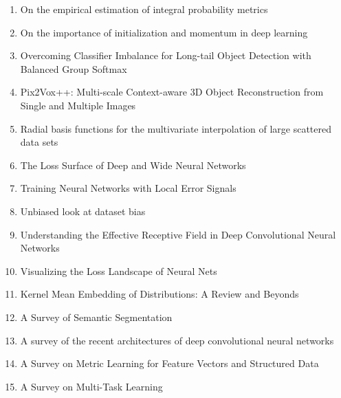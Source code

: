\documentclass[acmlarge]{acmart}
\begin{document}
\begin{enumerate}
	\item On the empirical estimation of integral probability metrics \cite{Sriperumbudur2012OnTE} 

	\item On the importance of initialization and momentum in deep learning \cite{Sutskever2013OnTI} 

	\item Overcoming Classifier Imbalance for Long-tail Object Detection with Balanced Group Softmax \cite{Li2020OvercomingCI} 

	\item Pix2Vox++: Multi-scale Context-aware 3D Object Reconstruction from Single and Multiple Images \cite{Xie2020Pix2VoxMC} 

	\item Radial basis functions for the multivariate interpolation of large scattered data sets \cite{Lazzaro2002RadialBF} 

	\item The Loss Surface of Deep and Wide Neural Networks \cite{Nguyen2017TheLS} 

	\item Training Neural Networks with Local Error Signals \cite{Nkland2019TrainingNN} 

	\item Unbiased look at dataset bias \cite{Torralba2011UnbiasedLA} 

	\item Understanding the Effective Receptive Field in Deep Convolutional Neural Networks \cite{Luo2016UnderstandingTE} 

	\item Visualizing the Loss Landscape of Neural Nets \cite{Li2018VisualizingTL} 

	\item Kernel Mean Embedding of Distributions: A Review and Beyonds \cite{Muandet2017KernelME} 

	\item A Survey of Semantic Segmentation \cite{Thoma2016ASO} 

	\item A survey of the recent architectures of deep convolutional neural networks \cite{Khan2020ASO} 

	\item A Survey on Metric Learning for Feature Vectors and Structured Data \cite{Bellet2013ASO} 

	\item A Survey on Multi-Task Learning \cite{Zhang2017ASO} 


\end{enumerate}
\end{document}
